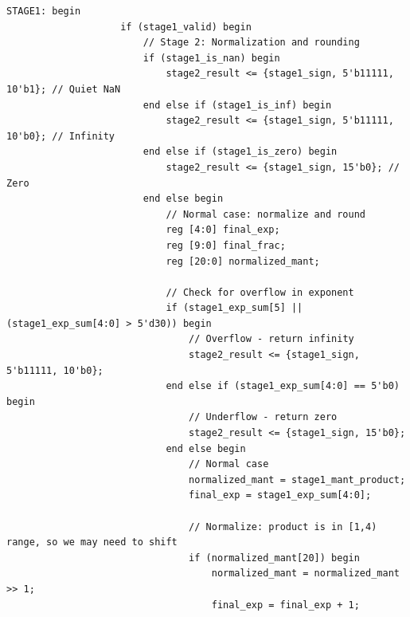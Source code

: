\documentclass[UTF8]{ctexart}
\begin{document}
\begin{lstlisting}[frame=shadowbox,caption=fp\_multiplier\_generated.v]
                STAGE1: begin
                    if (stage1_valid) begin
                        // Stage 2: Normalization and rounding
                        if (stage1_is_nan) begin
                            stage2_result <= {stage1_sign, 5'b11111, 10'b1}; // Quiet NaN
                        end else if (stage1_is_inf) begin
                            stage2_result <= {stage1_sign, 5'b11111, 10'b0}; // Infinity
                        end else if (stage1_is_zero) begin
                            stage2_result <= {stage1_sign, 15'b0}; // Zero
                        end else begin
                            // Normal case: normalize and round
                            reg [4:0] final_exp;
                            reg [9:0] final_frac;
                            reg [20:0] normalized_mant;
                            
                            // Check for overflow in exponent
                            if (stage1_exp_sum[5] || (stage1_exp_sum[4:0] > 5'd30)) begin
                                // Overflow - return infinity
                                stage2_result <= {stage1_sign, 5'b11111, 10'b0};
                            end else if (stage1_exp_sum[4:0] == 5'b0) begin
                                // Underflow - return zero
                                stage2_result <= {stage1_sign, 15'b0};
                            end else begin
                                // Normal case
                                normalized_mant = stage1_mant_product;
                                final_exp = stage1_exp_sum[4:0];
                                
                                // Normalize: product is in [1,4) range, so we may need to shift
                                if (normalized_mant[20]) begin
                                    normalized_mant = normalized_mant >> 1;
                                    final_exp = final_exp + 1;
                                    

\end{lstlisting}
\end{document}
